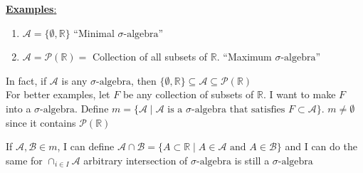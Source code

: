\documentclass[11pt]{article}
\newcommand{\siga}{\sigma\text{-algebra}}
\begin{document}
    \underline{\textbf{Examples}:}

    \begin{enumerate}
        \item $\mathcal{A} = \{ \emptyset, \mathbb{R} \}$ ``Minimal $\siga$''
        \item $\mathcal{A} = \mathcal{P}(\mathbb{R}) = $ Collection of all subsets of $\mathbb{R}$.
        ``Maximum $\siga$''
    \end{enumerate}
    
    In fact, if $\mathcal{A}$ is any $\siga$, then $\{ \emptyset,\mathbb{R} \} \subseteq \mathcal{A} \subseteq \mathcal{P}(\mathbb{R})$\\

    For better examples, let $F$ be any collection of subsets of $\mathbb{R}$.
    I want to make $F$ into a $\siga$.
    Define $m = \{ \mathcal{A} \mid \mathcal{A} \text{ is a } \siga \text{ that satisfies } F \subset \mathcal{A} \}$.
    $m \neq \emptyset$ since it contains $\mathcal{P}(\mathbb{R})$

    If $\mathcal{A}, \mathcal{B} \in m$, I can define $\mathcal{A} \cap \mathcal{B} = \{ A \subset \mathbb{R} \mid A \in \mathcal{A} \text{ and } A \in \mathcal{B} \}$ and I can do the same for $\cap_{i \in I} \mathcal{A}$ arbitrary intersection of $\siga$ is still a $\siga$
\end{document}
